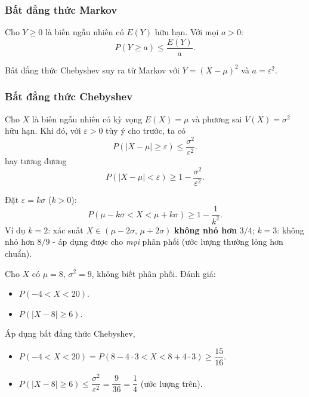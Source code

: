 \documentclass[12pt,a4paper]{article}
\begin{document}
\subsubsection{Bất đẳng thức Markov}

\begin{dinhly}[title={Bất đẳng thức Markov}]
Cho $Y \ge 0$ là biến ngẫu nhiên có $E(Y)$ hữu hạn. Với mọi $a > 0$:
\[
  P(Y \ge a) \le \dfrac{E(Y)}{a}.
\]
\end{dinhly}

\begin{luuy}
Bất đẳng thức Chebyshev suy ra từ Markov với $Y = (X - \mu)^2$ và $a = \varepsilon^2$.
\end{luuy}

\subsubsection{Bất đẳng thức Chebyshev}

\begin{dinhly}[title={Bất đẳng thức Chebyshev}]
  Cho $X$ là biến ngẫu nhiên có kỳ vọng $E(X) = \mu$ và phương sai $V(X) = \sigma^2$ hữu hạn. Khi đó, với $\varepsilon > 0$ tùy ý cho trước, ta có
\[
  P(|X - \mu| \ge \varepsilon) \le \dfrac{\sigma^2}{\varepsilon^2}.
\]
hay tương đương
\[
  P(|X - \mu| < \varepsilon) \ge 1 - \dfrac{\sigma^2}{\varepsilon^2}.
\]
\end{dinhly}

\begin{luuy}[title={Dạng theo $k\sigma$}]
Đặt $\varepsilon = k\sigma$ ($k > 0$):
\[
  P(\mu - k\sigma < X < \mu + k\sigma) \ge 1 - \dfrac{1}{k^2}.
\]
Ví dụ $k = 2$: xác suất $X \in (\mu - 2\sigma,\, \mu + 2\sigma)$ \textbf{không nhỏ hơn} $3/4$; $k = 3$: không nhỏ hơn $8/9$ - áp dụng được cho \emph{mọi} phân phối (ước lượng thường lỏng hơn chuẩn).
\end{luuy}

\begin{vidu}[title={Ước lượng bằng Chebyshev}]
Cho $X$ có $\mu = 8$, $\sigma^2 = 9$, không biết phân phối. Đánh giá:
\begin{itemize}
  \item $P(-4 < X < 20)$.
  \item $P(|X - 8| \ge 6)$.
\end{itemize}

Áp dụng bất đẳng thức Chebyshev,
\begin{itemize}
  \item $P(-4 < X < 20) = P(8 - 4\cdot 3 < X < 8 + 4\cdot 3) \ge \dfrac{15}{16}$.
  \item $P(|X - 8| \ge 6) \le \dfrac{\sigma^2}{\varepsilon^2} = \dfrac{9}{36} = \dfrac{1}{4}$ (ước lượng trên).
\end{itemize}
\end{vidu}
\end{document}

